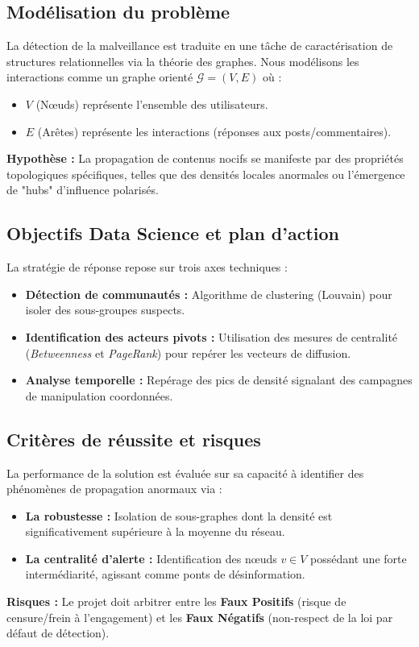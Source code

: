 \documentclass[12pt]{report}
\begin{document}
\subsection{Modélisation du problème}
La détection de la malveillance est traduite en une tâche de caractérisation de structures relationnelles via la théorie des graphes. Nous modélisons les interactions comme un graphe orienté $\mathcal{G} = (V, E)$ où :
\begin{itemize}
    \item $V$ (Nœuds) représente l'ensemble des utilisateurs.
    \item $E$ (Arêtes) représente les interactions (réponses aux posts/commentaires).
\end{itemize}
\textbf{Hypothèse :} La propagation de contenus nocifs se manifeste par des propriétés topologiques spécifiques, telles que des densités locales anormales ou l'émergence de "hubs" d'influence polarisés.

\subsection{Objectifs Data Science et plan d'action}
La stratégie de réponse repose sur trois axes techniques :
\begin{itemize}
    \item \textbf{Détection de communautés :} Algorithme de clustering (Louvain) pour isoler des sous-groupes suspects.
    \item \textbf{Identification des acteurs pivots :} Utilisation des mesures de centralité (\textit{Betweenness} et \textit{PageRank}) pour repérer les vecteurs de diffusion.    
    \item \textbf{Analyse temporelle :} Repérage des pics de densité signalant des campagnes de manipulation coordonnées.
\end{itemize}

\subsection{Critères de réussite et risques}
La performance de la solution est évaluée sur sa capacité à identifier des phénomènes de propagation anormaux via :
\begin{itemize}
    \item \textbf{La robustesse :} Isolation de sous-graphes dont la densité est significativement supérieure à la moyenne du réseau.
    \item \textbf{La centralité d'alerte :} Identification des nœuds $v \in V$ possédant une forte intermédiarité, agissant comme ponts de désinformation.
\end{itemize}
\textbf{Risques :} Le projet doit arbitrer entre les \textbf{Faux Positifs} (risque de censure/frein à l'engagement) et les \textbf{Faux Négatifs} (non-respect de la loi par défaut de détection).
\end{document}

